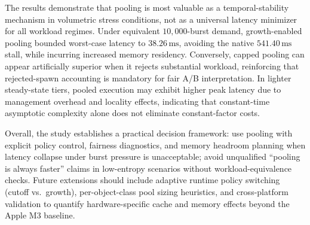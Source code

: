 \documentclass[11pt]{article}
\begin{document}
The results demonstrate that pooling is most valuable as a temporal-stability mechanism in volumetric stress conditions, not as a universal latency minimizer for all workload regimes. Under equivalent \(10{,}000\)-burst demand, growth-enabled pooling bounded worst-case latency to \(38.26\,\mathrm{ms}\), avoiding the native \(541.40\,\mathrm{ms}\) stall, while incurring increased memory residency. Conversely, capped pooling can appear artificially superior when it rejects substantial workload, reinforcing that rejected-spawn accounting is mandatory for fair A/B interpretation. In lighter steady-state tiers, pooled execution may exhibit higher peak latency due to management overhead and locality effects, indicating that constant-time asymptotic complexity alone does not eliminate constant-factor costs.

Overall, the study establishes a practical decision framework: use pooling with explicit policy control, fairness diagnostics, and memory headroom planning when latency collapse under burst pressure is unacceptable; avoid unqualified ``pooling is always faster'' claims in low-entropy scenarios without workload-equivalence checks. Future extensions should include adaptive runtime policy switching (cutoff vs.\ growth), per-object-class pool sizing heuristics, and cross-platform validation to quantify hardware-specific cache and memory effects beyond the Apple M3 baseline.
\end{document}
